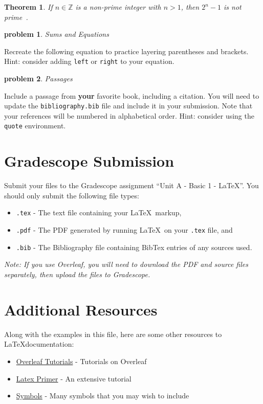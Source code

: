 \documentclass[10pt]{article}
\newtheorem{problem}{\sc\color{cit}problem}
\newtheorem{theorem}{Theorem}
\newcommand{\Z}{\mathbb{Z}} %
\begin{document}
\begin{theorem}
    If $n \in \Z$ is a non-prime integer with $n>1$, then $2^n - 1$ is not prime~\cite{velleman}.
\end{theorem}







\begin{problem} Sums and Equations \end{problem}

Recreate the following equation to practice layering parentheses and brackets.  Hint: consider adding \verb|left| or \verb|right| to your equation.






\begin{problem} Passages \end{problem}
    Include a passage from \textbf{your} favorite book, including a citation.  You will need to update the \verb|bibliography.bib| file and include it in your submission. Note that your references will be numbered in alphabetical order.  Hint: consider using the \verb|quote| environment.






\section*{Gradescope Submission}
Submit your files to the Gradescope assignment ``Unit A - Basic 1 - LaTeX''.  You should only submit the following file types:
\begin{itemize}
    \item \verb|.tex| - The text file containing your \LaTeX~markup,
    \item \verb|.pdf| - The PDF generated by running \LaTeX~on your \verb|.tex| file, and
    \item \verb|.bib| - The Bibliography file containing BibTex entries of any sources used.
\end{itemize}
\textit{Note: If you use Overleaf, you will need to download the PDF and source files separately, then upload the files to Gradescope.}

\section*{Additional Resources}

Along with the examples in this file, here are some other resources to \LaTeX documentation:

\begin{itemize}
    \item \href{https://www.overleaf.com/learn/latex/Tutorials}{Overleaf Tutorials} - Tutorials on Overleaf
    \item \href{https://www.maths.tcd.ie/~dwilkins/LaTeXPrimer/}{Latex Primer} - An extensive tutorial
    \item \href{http://www.cs.put.poznan.pl/ksiek/latexmath.html#set-theory}{Symbols} - Many symbols that you may wish to include
\end{itemize}



\end{document}
